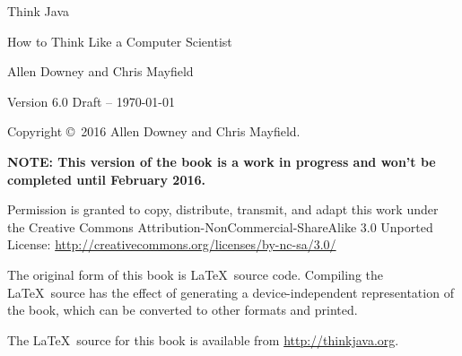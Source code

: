 \documentclass[12pt]{book}
\title{\thetitle}
\author{\theauthors}
\date{\theversion}
\newcommand{\theauthors}{Allen Downey and Chris Mayfield}
\newcommand{\theversion}{Version 6.0 Draft -- \today}
\theoremstyle{exercise}
\begin{document}
\frontmatter

%
%
%
%
%



\pagebreak
\thispagestyle{empty}

\begin{flushright}
\vspace*{2.0in}

{\huge Think Java}

\vspace{0.25in}
{\LARGE How to Think Like a Computer Scientist}

\vspace{1in}
{\Large \theauthors}

\vspace{1in}
{\large \theversion}

\vfill

\end{flushright}

\pagebreak
\thispagestyle{empty}

Copyright \copyright ~2016 Allen Downey and Chris Mayfield.

{\bf NOTE: This version of the book is a work in progress and won't be completed until February 2016.}

\vspace{0.25in}

Permission is granted to copy, distribute, transmit, and adapt this work under the Creative Commons Attribution-NonCommercial-ShareAlike 3.0 Unported License: \url{http://creativecommons.org/licenses/by-nc-sa/3.0/}

The original form of this book is \LaTeX\ source code.
Compiling the \LaTeX\ source has the effect of generating a device-independent representation of the book, which can be converted to other formats and printed.

The \LaTeX\ source for this book is available from \url{http://thinkjava.org}.
\end{document}
